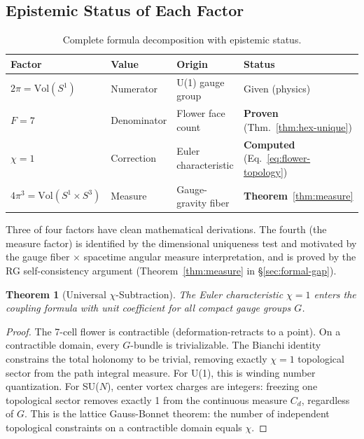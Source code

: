 \documentclass[12pt,a4paper]{article}
\theoremstyle{plain}
\newtheorem{theorem}{Theorem}[section]
\theoremstyle{definition}
\begin{document}
\subsection{Epistemic Status of Each Factor}

\begin{table}[H]
\centering
\begin{tabular}{llll}
\toprule
\textbf{Factor} & \textbf{Value} & \textbf{Origin} & \textbf{Status} \\
\midrule
$2\pi = \mathrm{Vol}(S^1)$ & Numerator & U(1) gauge group & Given (physics) \\
$F = 7$ & Denominator & Flower face count & \textbf{Proven} (Thm.~\ref{thm:hex-unique}) \\
$\chi = 1$ & Correction & Euler characteristic & \textbf{Computed} (Eq.~\ref{eq:flower-topology}) \\
$4\pi^3 = \mathrm{Vol}(S^1 \times S^3)$ & Measure & Gauge-gravity fiber & \textbf{Theorem}~\ref{thm:measure} \\
\bottomrule
\end{tabular}
\caption{Complete formula decomposition with epistemic status.}
\end{table}

Three of four factors have clean mathematical derivations. The fourth (the measure factor) is identified by the dimensional uniqueness test and motivated by the gauge fiber $\times$ spacetime angular measure interpretation, and is proved by the RG self-consistency argument (Theorem~\ref{thm:measure} in \S\ref{sec:formal-gap}).

\begin{theorem}[Universal $\chi$-Subtraction]\label{thm:chi}
The Euler characteristic $\chi = 1$ enters the coupling formula with unit coefficient for \emph{all} compact gauge groups $G$.
\end{theorem}

\begin{proof}
The 7-cell flower is contractible (deformation-retracts to a point). On a contractible domain, every $G$-bundle is trivializable. The Bianchi identity constrains the total holonomy to be trivial, removing exactly $\chi = 1$ topological sector from the path integral measure. For U(1), this is winding number quantization. For SU($N$), center vortex charges are integers: freezing one topological sector removes exactly 1 from the continuous measure $C_d$, regardless of $G$. This is the lattice Gauss-Bonnet theorem: the number of independent topological constraints on a contractible domain equals $\chi$. \qedhere
\end{proof}
\end{document}
